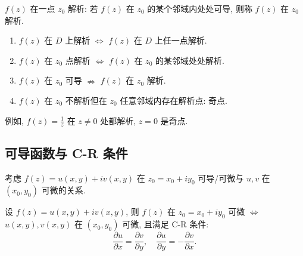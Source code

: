 \documentclass[theorem=false,mathfont=none,openany,sub3section]{easybook}
\begin{document}
\begin{definition}
  $f(z)$ 在一点 $z_{0}$ 解析: 若 $f(z)$ 在 $z_{0}$ 的某个邻域内处处可导, 则称 $f(z)$ 在 $z_{0}$ 解析.
\end{definition}

\begin{remark}
  \begin{enumerate}
    \item $f(z)$ 在 $D$ 上解析 $\Leftrightarrow$ $f(z)$ 在 $D$ 上任一点解析.
    \item $f(z)$ 在 $z_{0}$ 点解析 $\Leftrightarrow$ $f(z)$ 在 $z_{0}$ 的某邻域处处解析.
    \item $f(z)$ 在 $z_{0}$ 可导 $\nRightarrow$ $f(z)$ 在 $z_{0}$ 解析.
    \item $f(z)$ 在 $z_{0}$ 不解析但在 $z_{0}$ 任意邻域内存在解析点: 奇点.
  \end{enumerate}
\end{remark}

例如, $f(z)=\frac{1}{z}$ 在 $z\neq0$ 处都解析, $z=0$ 是奇点.

\subsection{可导函数与 C-R 条件}

考虑 $f(z)=u(x,y)+iv(x,y)$ 在 $z_{0}=x_{0}+iy_{0}$ 可导/可微与 $u,v$ 在 $(x_{0},y_{0})$ 可微的关系.

\begin{theorem}
  设 $f(z)=u(x,y)+iv(x,y)$, 则 $f(z)$ 在 $z_{0}=x_{0}+iy_{0}$ 可微 $\Leftrightarrow$ $u(x,y),v(x,y)$ 在 $(x_{0},y_{0})$ 可微, 且满足 C-R 条件:
  \[
  \frac{\partial u}{\partial x}=\frac{\partial v}{\partial y},\quad
  \frac{\partial u}{\partial y}=-\frac{\partial v}{\partial x}.
  \]
\end{theorem}
\end{document}
